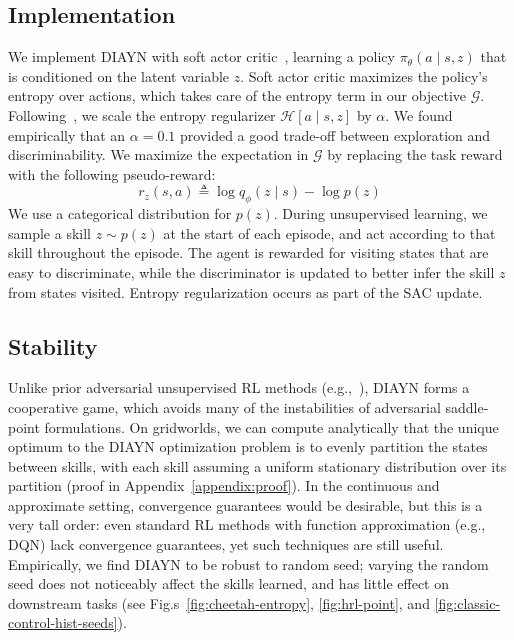 \documentclass{article} %
\newcommand{\h}{\mathcal{H}}
\theoremstyle{questionstyle}\newtheorem{question}{Question}
\begin{document}
\subsection{Implementation}
\label{sec:implementation}


We implement DIAYN with soft actor critic~\citep{haarnoja2018soft}, learning a policy $\pi_{\theta}(a \mid s, z)$ that is conditioned on the latent variable $z$.
Soft actor critic maximizes the policy's entropy over actions, which takes care of the entropy term in our objective $\mathcal{G}$. Following~\citet{haarnoja2018soft}, we scale the entropy regularizer $\h[a \mid s, z]$ by $\alpha$. We found empirically that an $\alpha = 0.1$ provided a good trade-off between exploration and discriminability. We maximize the expectation in $\mathcal{G}$ by replacing the task reward with the following pseudo-reward:
\begin{equation}
    r_z(s, a) \triangleq \log q_{\phi}(z \mid s) - \log p(z)
    \label{eq:reward}
\end{equation}
We use a categorical distribution for $p(z)$. During unsupervised learning, we sample a skill $z \sim p(z)$ at the start of each episode, and act according to that skill throughout the episode. The agent is rewarded for visiting states that are easy to discriminate, while the discriminator is updated to better infer the skill $z$ from states visited. Entropy regularization occurs as part of the SAC update.

\subsection{Stability}
Unlike prior adversarial unsupervised RL methods (e.g.,~\cite{sukhbaatar2017intrinsic}), DIAYN forms a cooperative game, which avoids many of the instabilities of adversarial saddle-point formulations. 
On gridworlds, we can compute analytically that the unique optimum to the DIAYN optimization problem is to evenly partition the states between skills, with each skill assuming a uniform stationary distribution over its partition (proof in Appendix~\ref{appendix:proof}).
In the continuous and approximate setting, convergence guarantees would be desirable, but this is a very tall order: even standard RL methods with function approximation (e.g., DQN) lack convergence guarantees, yet such techniques are still useful. Empirically, we find DIAYN to be robust to random seed; varying the random seed does not noticeably affect the skills learned, and has little effect on downstream tasks (see Fig.s~\ref{fig:cheetah-entropy}, \ref{fig:hrl-point}, and \ref{fig:classic-control-hist-seeds}).
\end{document}
